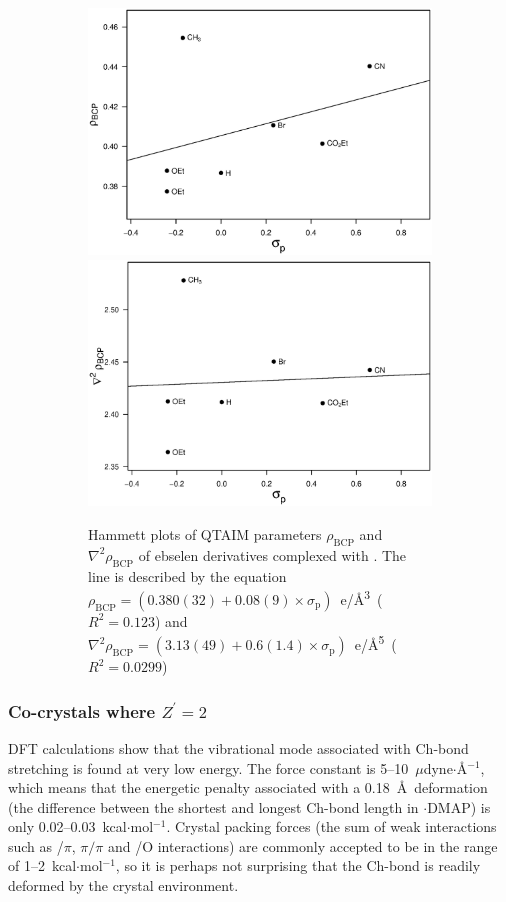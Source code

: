 \begin{refsection}
\begin{figure}
\begin{subfigure}{\linewidth}
  \centering
  \includegraphics[width=0.45\linewidth]{Figures/hammett-rho-pyrrol-p.eps}
  \includegraphics[width=0.45\linewidth]{Figures/hammett-lapl-pyrrol-p.eps}
  \caption[Hammett plots of QTAIM parameters $\rho_\text{BCP}$ and $\nabla^2\rho_{\text{BCP}}$ of ebselen derivatives complexed with .]{Hammett plots of QTAIM parameters $\rho_\text{BCP}$ and $\nabla^2\rho_{\text{BCP}}$ of ebselen derivatives complexed with . The line is described by the equation $\rho_{\text{BCP}} = (0.380(32) + 0.08(9) \times \sigma_\text{p})$~e/\AA\textsuperscript{3}~($R^2=0.123$) and $\nabla^2\rho_{\text{BCP}} = (3.13(49) + 0.6(1.4) \times \sigma_\text{p})$~e/\AA\textsuperscript{5}~($R^2=0.0299$)}\label{fig:hammett-qtaim-pyrrol}
\end{subfigure}

\caption[Hammett plots of QTAIM parameters for ebselen derivatives complexed with various Lewis bases.]{}
\end{figure}

\FloatBarrier

\subsubsection{Co-crystals where \texorpdfstring{$Z^\prime=2$}{Z'=2}}\label{sec:z2}
DFT calculations show that the vibrational mode associated with Ch-bond stretching is found at very low energy.
The force constant is 5--10~$\mu$dyne$ \cdot $\AA$^{-1}$, which means that the energetic penalty associated with a 0.18~\AA\ deformation (the difference between the shortest and longest Ch-bond length in $ \cdot $DMAP) is only 0.02--0.03~kcal$ \cdot $mol$^{-1}$.
Crystal packing forces (the sum of weak interactions such as /$\pi$, $\pi /\pi$ and /O interactions) are commonly accepted to be in the range of 1--2~kcal$ \cdot $mol$^{-1}$, so it is perhaps not surprising that the Ch-bond is readily deformed by the crystal environment.\autocite{Dunitz1988}


\end{refsection}
